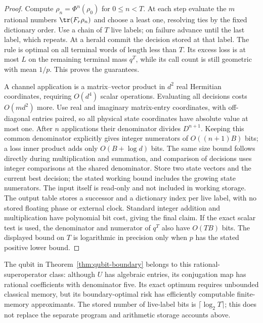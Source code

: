 \begin{proof}
Compute $\rho_n=\Phi^n(\rho_0)$ for $0\le n<T$. At each step evaluate the $m$ rational numbers $\tr(F_r\rho_n)$ and choose a least one, resolving ties by the fixed dictionary order. Use a chain of $T$ live labels; on failure advance until the last label, which repeats. At a herald commit the decision stored at that label. The rule is optimal on all terminal words of length less than $T$. Its excess loss is at most $L$ on the remaining terminal mass $q^T$, while its call count is still geometric with mean $1/p$. This proves the guarantees.

A channel application is a matrix--vector product in $d^2$ real Hermitian coordinates, requiring $O(d^4)$ scalar operations. Evaluating all decisions costs $O(md^2)$ more. Use real and imaginary matrix-entry coordinates, with off-diagonal entries paired, so all physical state coordinates have absolute value at most one. After $n$ applications their denominator divides $D^{n+1}$. Keeping this common denominator explicitly gives integer numerators of $O((n+1)B)$ bits; a loss inner product adds only $O(B+\log d)$ bits. The same size bound follows directly during multiplication and summation, and comparison of decisions uses integer comparisons at the shared denominator. Store two state vectors and the current best decision; the stated working bound includes the growing state numerators. The input itself is read-only and not included in working storage. The output table stores a successor and a dictionary index per live label, with no stored floating phase or external clock. Standard integer addition and multiplication have polynomial bit cost, giving the final claim. If the exact scalar test is used, the denominator and numerator of $q^T$ also have $O(TB)$ bits. The displayed bound on $T$ is logarithmic in precision only when $p$ has the stated positive lower bound.
\end{proof}

The qubit in Theorem~\ref{thm:qubit-boundary} belongs to this rational-superoperator class: although $U$ has algebraic entries, its conjugation map has rational coefficients with denominator five. Its exact optimum requires unbounded classical memory, but its boundary-optimal risk has efficiently computable finite-memory approximants. The stored number of live-label bits is $\lceil\log_2T\rceil$; this does not replace the separate program and arithmetic storage accounts above.

